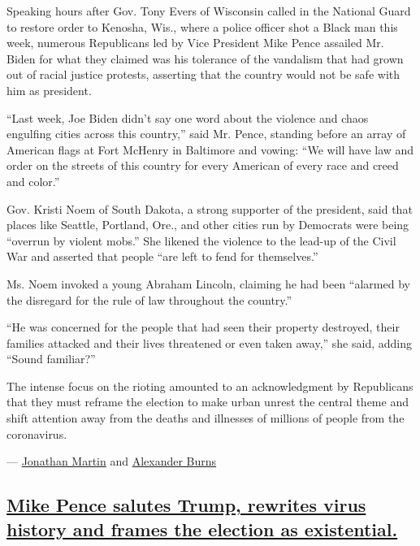 Speaking hours after Gov. Tony Evers of Wisconsin called in the National
Guard to restore order to Kenosha, Wis., where a police officer shot a
Black man this week, numerous Republicans led by Vice President Mike
Pence assailed Mr. Biden for what they claimed was his tolerance of the
vandalism that had grown out of racial justice protests, asserting that
the country would not be safe with him as president.

``Last week, Joe Biden didn't say one word about the violence and chaos
engulfing cities across this country,'' said Mr. Pence, standing before
an array of American flags at Fort McHenry in Baltimore and vowing: ``We
will have law and order on the streets of this country for every
American of every race and creed and color.''

Gov. Kristi Noem of South Dakota, a strong supporter of the president,
said that places like Seattle, Portland, Ore., and other cities run by
Democrats were being ``overrun by violent mobs.'' She likened the
violence to the lead-up of the Civil War and asserted that people ``are
left to fend for themselves.''

Ms. Noem invoked a young Abraham Lincoln, claiming he had been ``alarmed
by the disregard for the rule of law throughout the country.''

``He was concerned for the people that had seen their property
destroyed, their families attacked and their lives threatened or even
taken away,'' she said, adding ``Sound familiar?''

The intense focus on the rioting amounted to an acknowledgment by
Republicans that they must reframe the election to make urban unrest the
central theme and shift attention away from the deaths and illnesses of
millions of people from the coronavirus.

---
\href{https://www.nytimes3xbfgragh.onion/by/jonathan-martin}{Jonathan
Martin} and
\href{https://www.nytimes3xbfgragh.onion/by/alexander-burns}{Alexander
Burns}

\hypertarget{mike-pence-salutes-trump-rewrites-virus-history-and-frames-the-election-as-existential}{%
\subsection{\texorpdfstring{\protect\hyperlink{mike-pence-salutes-trump-rewrites-virus-history-and-frames-the-election-as-existential}{Mike
Pence salutes Trump, rewrites virus history and frames the election as
existential.}}{Mike Pence salutes Trump, rewrites virus history and frames the election as existential.}}\label{mike-pence-salutes-trump-rewrites-virus-history-and-frames-the-election-as-existential}}

